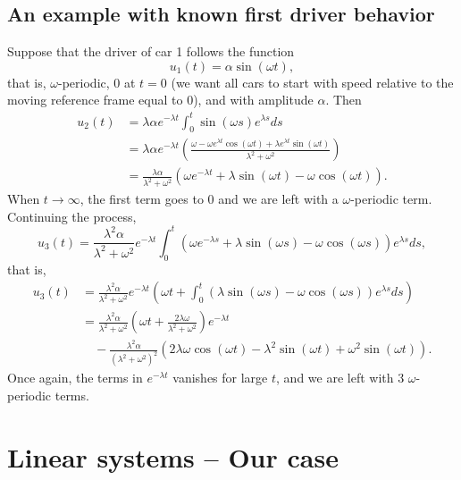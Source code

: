 \subsection{An example with known first driver behavior}
Suppose that the driver of car 1 follows the function
\[
u_1(t)=\alpha\sin(\omega t),
\]
that is, $\omega$-periodic, 0 at $t=0$ (we want all cars to start with speed relative to the moving reference frame equal to 0), and with amplitude $\alpha$.
Then
\begin{align*}
u_2(t) &= \lambda\alpha e^{-\lambda t}\int_0^t \sin(\omega s)e^{\lambda s}ds \\
&= \lambda\alpha e^{-\lambda t}
\left(
\frac{\omega-\omega e^{\lambda t} \cos(\omega t)+\lambda e^{\lambda t} \sin(\omega t)}{\lambda^2+\omega^2}
\right) \\
&= \frac{\lambda\alpha}{\lambda^2+\omega^2}\left(\omega e^{-\lambda t}
+\lambda\sin(\omega t)-\omega\cos(\omega t)\right).
\end{align*}
When $t\to\infty$, the first term goes to 0 and we are left with a $\omega$-periodic
term.
Continuing the process,
\[
u_3(t) = \frac{\lambda^2\alpha}{\lambda^2+\omega^2} e^{-\lambda t}
\int_0^t \left(\omega e^{-\lambda s}
+\lambda\sin(\omega s)-\omega\cos(\omega s)\right)e^{\lambda s}ds,
\]
that is,
\begin{align*}
u_3(t) &= \frac{\lambda^2\alpha}{\lambda^2+\omega^2}e^{-\lambda t}\left(\omega t+\int_0^t \left(\lambda\sin(\omega s)-\omega\cos(\omega s)\right)e^{\lambda s}ds\right) \\
&= \frac{\lambda^2\alpha}{\lambda^2+\omega^2}\left(\omega t+\frac{2 \lambda \omega}{\lambda^2+\omega^2}\right)e^{-\lambda t}\\
&\quad -\frac{\lambda^2\alpha}{(\lambda^2+\omega^2)^2}\left(2 \lambda \omega \cos(\omega t)-\lambda^2 \sin(\omega t)+\omega^2 \sin(\omega t)\right).
\end{align*}
Once again, the terms in $e^{-\lambda t}$ vanishes for large $t$, and we are left with 3 $\omega$-periodic terms.




\section{Linear systems -- Our case}
